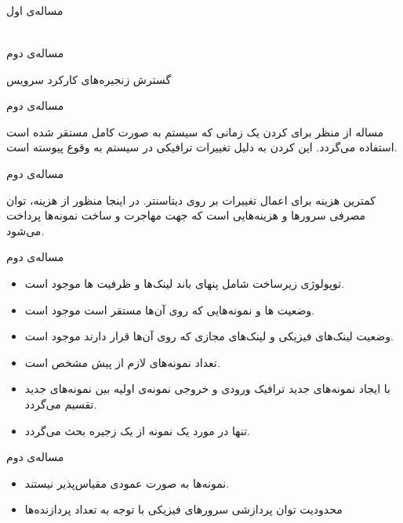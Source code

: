 \documentclass{beamer}
\makeatletter
\newcommand{\RTList}{\raggedleft\rightskip\@totalleftmargin}
\makeatother
\begin{document}
\begin{persian}
\begin{frame}{مساله‌ی اول}
\begin{latin}
\begin{align}
	\end{align}\end{latin}
\end{frame}
\begin{frame}
	\begin{multicols}{3}
		\begin{center}	
			مساله‌ی دوم
		\end{center}
	\end{multicols}
	\begin{center}	
		گسترش زنجیره‌های کارکرد سرویس
	\end{center}
\end{frame}
\begin{frame}{مساله‌ی دوم}
	\par
	مساله از منظر  برای  کردن یک 
	زمانی که سیستم به صورت کامل مستقر شده است استفاده می‌گردد.
	این  کردن به دلیل تغییرات ترافیکی در سیستم به وقوع پیوسته است.
\end{frame}
\begin{frame}{مساله‌ی دوم}
	\par
	کمترین هزینه برای اعمال تغییرات بر روی دیتاسنتر.
	در اینجا منظور از هزینه، توان مصرفی سرورها و هزینه‌هایی است که جهت مهاجرت و ساخت نمونه‌ها پرداخت می‌شود.
\end{frame}
\begin{frame}{مساله‌ی دوم}
	\begin{itemize}\RTList{}
		\item توپولوژی زیرساخت شامل پنهای باند لینک‌ها و ظرفیت ها موجود است.
		\item وضعیت ها و نمونه‌هایی که روی آن‌ها مستقر است موجود است.
		\item وضعیت لینک‌های فیزیکی و لینک‌های مجازی که روی آن‌ها قرار دارند موجود است.
		\item تعداد نمونه‌های لازم از پیش مشخص است.
		\item با ایجاد نمونه‌های جدید ترافیک ورودی و خروجی نمونه‌ی اولیه بین نمونه‌های جدید تقسیم می‌گردد.
		\item تنها در مورد یک نمونه از یک زجیره بحث می‌گردد.
	\end{itemize}
\end{frame}
\begin{frame}{مساله‌ی دوم}
	\begin{itemize}\RTList{}
		\item نمونه‌ها به صورت عمودی مقیاس‌پذیر نیستند.
		\item محدودیت توان پردازشی سرورهای فیزیکی با توجه به تعداد پردازنده‌ها

\end{itemize}
\end{frame}
\end{persian}
\end{document}
